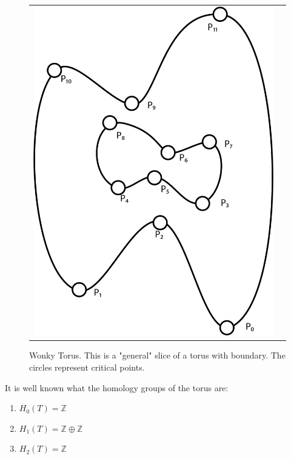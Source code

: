 \documentclass[a4paper]{article}
\theoremstyle{theorem}
\theoremstyle{definition}
\theoremstyle{remark}
\theoremstyle{gremark}
\theoremstyle{discussion}
\theoremstyle{notation}
\begin{document}
	\begin{figure}
	\vspace{-1.75\baselineskip}
	\begin{tabularx}{\linewidth}{@{} cX @{}}
		\includegraphics[scale=0.41,valign=T]{example_figure_1.png}
		&
		\caption[Wonky Torus]
		{Wonky Torus. This is a "general" slice of a torus with boundary. The circles represent critical points.}
		\label{fig:transformer3}
	\end{tabularx}
\end{figure}



It is well known what the homology groups of the torus are:
\begin{enumerate}
	\item $H_0(T)=\mathbb{Z}$
	\item $H_1(T)=\mathbb{Z}\oplus\mathbb{Z}$
	\item $H_2(T)=\mathbb{Z}$
\end{enumerate}
\end{document}
